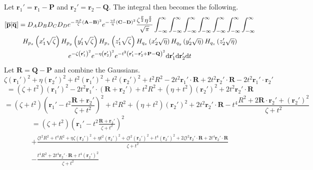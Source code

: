 Let $\mathbf{r}_1' = \mathbf{r}_1 - \mathbf{P}$ and $\mathbf{r}_2' = \mathbf{r}_2 - \mathbf{Q}$. The integral then becomes the following.
\begin{multline}
  \left[\overline{\mathbf{p}}\middle|\overline{\mathbf{q}}\right] = D_A D_B D_C D_D e^{-\frac{\alpha\beta}{\zeta}\left(\mathbf{A} - \mathbf{B}\right)^2}e^{-\frac{\gamma\delta}{\eta}\left(\mathbf{C} - \mathbf{D}\right)^2}\frac{\zeta^{\frac{p}{2}}\eta^{\frac{q}{2}}}{\sqrt{\pi}} \int_{-\infty}^\infty\int_{-\infty}^\infty\int_{-\infty}^\infty\int_{-\infty}^\infty\int_{-\infty}^\infty\int_{-\infty}^\infty \int_{-\infty}^\infty\\
  H_{p_x}\left(x_1'\sqrt{\zeta}\right)H_{p_y}\left(y_1'\sqrt{\zeta}\right)H_{p_z}\left(z_1'\sqrt{\zeta}\right) H_{q_x}\left(x_2'\sqrt{\eta}\right)H_{q_y}\left(y_2'\sqrt{\eta}\right)H_{q_z}\left(z_2'\sqrt{\eta}\right) \\
  e^{-\zeta\left(\mathbf{r}_1'\right)^2} e^{-\eta\left(\mathbf{r}_2'\right)^2} e^{-t^2 \left(\mathbf{r}_1' - \mathbf{r}_2' + \mathbf{P} - \mathbf{Q}\right)^2} \mathrm{d}\mathbf{r}_1' \mathrm{d}\mathbf{r}_2' \mathrm{d} t
  \label{fc-branch-point}
\end{multline}
Let $\mathbf{R} = \mathbf{Q} - \mathbf{P}$ and combine the Gaussians.
\begin{equation}
  \zeta \left(\mathbf{r}_1'\right)^2 + \eta \left(\mathbf{r}_2'\right)^2 + t^2 \left(\mathbf{r}_1'\right)^2 + t^2 \left(\mathbf{r}_2'\right)^2 + t^2 R^2 - 2t^2 \mathbf{r}_1' \cdot \mathbf{R} + 2t^2 \mathbf{r}_2' \cdot \mathbf{R} - 2t^2 \mathbf{r}_1' \cdot \mathbf{r}_2'
\end{equation}
\begin{equation}
  = \left(\zeta + t^2\right)\left(\mathbf{r}_1'\right)^2 - 2t^2 \mathbf{r}_1' \cdot \left(\mathbf{R} + \mathbf{r}_2'\right) + t^2 R^2 + \left(\eta + t^2\right)\left(\mathbf{r}_2'\right)^2 + 2t^2 \mathbf{r}_2'\cdot\mathbf{R}
\end{equation}
\begin{equation}
  = \left(\zeta + t^2\right)\left(\mathbf{r}_1' - t^2\frac{\mathbf{R} + \mathbf{r}_2'}{\zeta + t^2}\right)^2 + t^2 R^2 + \left(\eta + t^2\right)\left(\mathbf{r}_2'\right)^2 + 2t^2 \mathbf{r}_2'\cdot\mathbf{R} - t^4\frac{R^2 + 2\mathbf{R}\cdot\mathbf{r}_2' + \left(\mathbf{r}_2'\right)^2}{\zeta + t^2}
\end{equation}
\begin{multline}
  = \left(\zeta + t^2\right)\left(\mathbf{r}_1' - t^2\frac{\mathbf{R} + \mathbf{r}_2'}{\zeta + t^2}\right)^2 \\
  + \frac{\zeta t^2 R^2 + t^4 R^2 + \eta\zeta\left(\mathbf{r}_2'\right)^2 + \eta t^2 \left(\mathbf{r}_2'\right)^2 + \zeta t^2 \left(\mathbf{r}_2'\right)^2 + t^4 \left(\mathbf{r}_2'\right)^2 + 2\zeta t^2 \mathbf{r}_2'\cdot \mathbf{R} + 2t^4 \mathbf{r}_2'\cdot\mathbf{R}}{\zeta + t^2} \\
  - \frac{t^4 R^2 + 2t^4 \mathbf{r}_2'\cdot\mathbf{R} + t^4\left(\mathbf{r}_2'\right)^2}{\zeta + t^2}
\end{multline}
